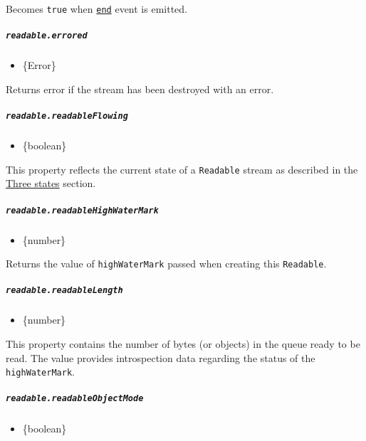 Becomes \texttt{true} when
\hyperref[event-end]{\texttt{\textquotesingle{}end\textquotesingle{}}}
event is emitted.

\subparagraph{\texorpdfstring{\texttt{readable.errored}}{readable.errored}}\label{readable.errored}

\begin{itemize}
\tightlist
\item
  \{Error\}
\end{itemize}

Returns error if the stream has been destroyed with an error.

\subparagraph{\texorpdfstring{\texttt{readable.readableFlowing}}{readable.readableFlowing}}\label{readable.readableflowing}

\begin{itemize}
\tightlist
\item
  \{boolean\}
\end{itemize}

This property reflects the current state of a \texttt{Readable} stream
as described in the \hyperref[three-states]{Three states} section.

\subparagraph{\texorpdfstring{\texttt{readable.readableHighWaterMark}}{readable.readableHighWaterMark}}\label{readable.readablehighwatermark}

\begin{itemize}
\tightlist
\item
  \{number\}
\end{itemize}

Returns the value of \texttt{highWaterMark} passed when creating this
\texttt{Readable}.

\subparagraph{\texorpdfstring{\texttt{readable.readableLength}}{readable.readableLength}}\label{readable.readablelength}

\begin{itemize}
\tightlist
\item
  \{number\}
\end{itemize}

This property contains the number of bytes (or objects) in the queue
ready to be read. The value provides introspection data regarding the
status of the \texttt{highWaterMark}.

\subparagraph{\texorpdfstring{\texttt{readable.readableObjectMode}}{readable.readableObjectMode}}\label{readable.readableobjectmode}

\begin{itemize}
\tightlist
\item
  \{boolean\}
\end{itemize}


